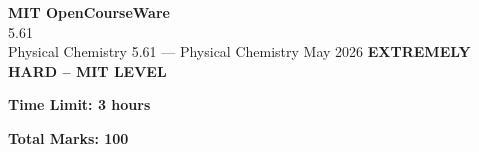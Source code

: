 \documentclass[12pt,a4paper]{exam}
\begin{document}
\begin{center}
{\LARGE \textbf{MIT OpenCourseWare}}\\5.61\\Physical Chemistry
\vspace{0.5cm}
{5.61} --- {Physical Chemistry}
\vspace{0.3cm}
May 2026
\vspace{0.3cm}
\textbf{EXTREMELY HARD -- MIT LEVEL}
\end{center}

\begin{center}
\textbf{Time Limit: 3 hours}
\end{center}

\begin{center}
\textbf{Total Marks: 100}
\end{center}

\vspace{0.5cm}
\end{document}
